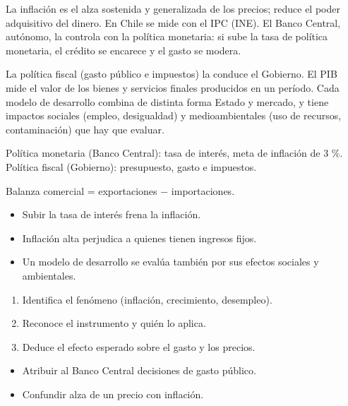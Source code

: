 \documentclass[10pt,a4paper,twocolumn]{article}
\begin{document}
La inflación es el alza sostenida y generalizada de los precios; reduce el poder adquisitivo del dinero. En Chile se mide con el IPC (INE). El Banco Central, autónomo, la controla con la política monetaria: si sube la tasa de política monetaria, el crédito se encarece y el gasto se modera.

La política fiscal (gasto público e impuestos) la conduce el Gobierno. El PIB mide el valor de los bienes y servicios finales producidos en un período. Cada modelo de desarrollo combina de distinta forma Estado y mercado, y tiene impactos sociales (empleo, desigualdad) y medioambientales (uso de recursos, contaminación) que hay que evaluar.

\begin{definicion}[Instrumentos]
Política monetaria (Banco Central): tasa de interés, meta de inflación de 3 \%. Política fiscal (Gobierno): presupuesto, gasto e impuestos.

Balanza comercial = exportaciones $-$ importaciones.
\end{definicion}

\begin{ideasclave}
\begin{itemize}
  \item Subir la tasa de interés frena la inflación.
  \item Inflación alta perjudica a quienes tienen ingresos fijos.
  \item Un modelo de desarrollo se evalúa también por sus efectos sociales y ambientales.
\end{itemize}
\end{ideasclave}

\begin{metodo}
\begin{enumerate}
  \item Identifica el fenómeno (inflación, crecimiento, desempleo).
  \item Reconoce el instrumento y quién lo aplica.
  \item Deduce el efecto esperado sobre el gasto y los precios.
\end{enumerate}
\end{metodo}

\begin{errorfrecuente}
\begin{itemize}
  \item Atribuir al Banco Central decisiones de gasto público.
  \item Confundir alza de un precio con inflación.
\end{itemize}
\end{errorfrecuente}
\end{document}
